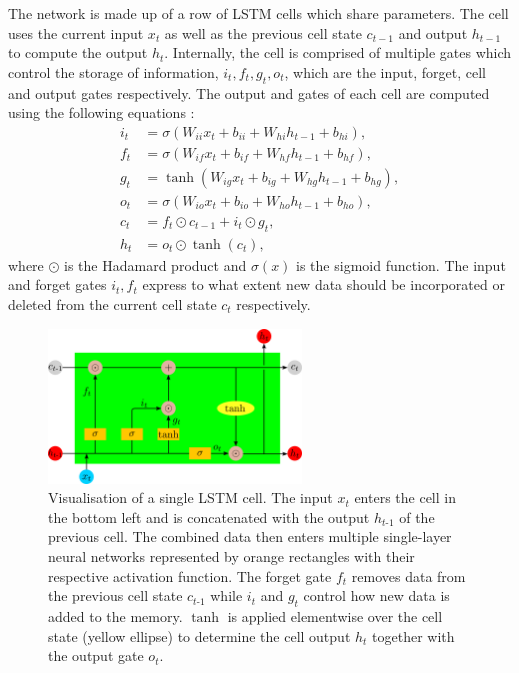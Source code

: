 The network is made up of a row of LSTM cells which share parameters.
The cell uses the current input $x_t$ as well as the previous cell state $c_{t-1}$ and output $h_{t-1}$ to compute the output $h_t$.
Internally, the cell is comprised of multiple gates which control the storage of information, $i_t, f_t, g_t, o_t$, which are the input, forget, cell and output gates respectively.
The output and gates of each cell are computed using the following equations \cite{NEURIPS2019_9015}:
\begin{align*}
i_t & = \sigma (W_{ii} x_t + b_{ii} + W_{hi} h_{t-1} + b_{hi}), \\
f_t & = \sigma (W_{if} x_t + b_{if} + W_{hf} h_{t-1} + b_{hf}), \\
g_t & = \tanh (W_{ig} x_t + b_{ig} + W_{hg} h_{t-1} + b_{hg}), \\ 
o_t & = \sigma (W_{io} x_t + b_{io} + W_{ho} h_{t-1} + b_{ho}), \\
c_t & = f_t \odot c_{t-1} + i_t \odot g_t, \\
h_t & = o_t \odot \tanh (c_t),
\end{align*}
where $\odot$ is the Hadamard product and $\sigma(x)$ is the sigmoid function.
The input and forget gates $i_t, f_t$ express to what extent new data should be incorporated or deleted from the current cell state $c_t$ respectively.

\begin{figure}
	\centering
	\includegraphics[width=0.6\textwidth]{img/lstm}
	\caption{Visualisation of a single LSTM cell. The input $x_t$ enters the cell in the bottom left and is concatenated with the output $h_{t\text{-}1}$ of the previous cell. The combined data then enters multiple single-layer neural networks represented by orange rectangles with their respective activation function. The forget gate $f_t$ removes data from the previous cell state $c_{t\text{-}1}$ while $i_t$ and $g_t$ control how new data is added to the memory. $\tanh$ is applied elementwise over the cell state (yellow ellipse) to determine the cell output $h_t$ together with the output gate $o_t$.}
	\label{lstm}
\end{figure}

